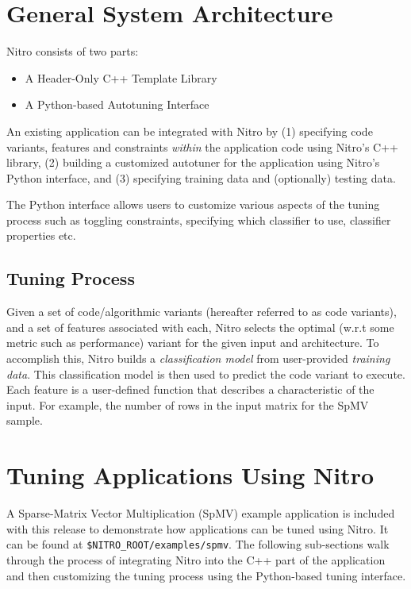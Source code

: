 \documentclass[12pt]{article}
\begin{document}
\section{General System Architecture}
Nitro consists of two parts:

\begin{itemize}
  \item A Header-Only C++ Template Library
  \item A Python-based Autotuning Interface
\end{itemize}

An existing application can be integrated with Nitro by (1) specifying code variants,
features and constraints \textsl{within} the application code using Nitro's
C++ library, (2) building a customized autotuner for the application using
Nitro's Python interface, and (3) specifying training data and (optionally)
testing data.

The Python interface allows users to customize various aspects of the tuning
process such as toggling
constraints, specifying which classifier to use, classifier properties etc.

\subsection{Tuning Process}
Given a set of code/algorithmic variants (hereafter referred to as code variants), and a
set of features associated with each, Nitro selects the optimal (w.r.t some
metric such as performance) variant for the given input and architecture. To accomplish
this, Nitro builds a \textsl{classification model} from user-provided \textsl{training data}.
This classification model is then used to predict the code variant to execute.
Each feature is a user-defined function that describes a characteristic of the input. For example,
the number of rows in the input matrix for the SpMV sample.

\section{Tuning Applications Using Nitro}

A Sparse-Matrix Vector Multiplication (SpMV) example application is included with this
release to demonstrate how applications can be tuned using Nitro. It can be found
at \texttt{\$NITRO\_ROOT/examples/spmv}. The following sub-sections
walk through the process of integrating Nitro into the C++ part of the application and then
customizing the tuning process using the Python-based tuning interface.
\end{document}
